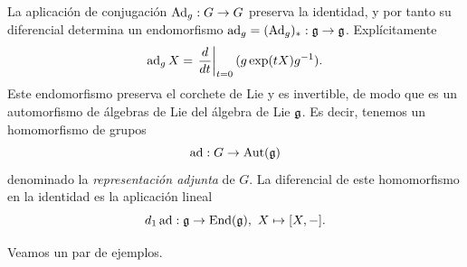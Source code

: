 \documentclass[11pt,a4paper]{amsbook}
\theoremstyle{remark} \newtheorem{rmk}[subsection]{Observación}
\theoremstyle{definition} \newtheorem{defn}[subsection]{Definición}
\theoremstyle{definition} \newtheorem{ex}[subsection]{Ejemplo}
\theoremstyle{definition} \newtheorem{ej}[subsection]{Ejercicio}
\begin{document}
\subsection{} La aplicación de conjugación $\operatorname{Ad}_g:G\rightarrow G$ preserva la identidad, y por tanto su diferencial determina un endomorfismo $\operatorname{ad}_g=(\operatorname{Ad}_g)_*:\mathfrak{g} \rightarrow \mathfrak{g}$. Explícitamente
\begin{equation*}
\operatorname{ad}_g X = \left. \frac{d}{dt}\right|_{t=0} (g \exp(tX) g^{-1}).
\end{equation*}
Este endomorfismo preserva el corchete de Lie y es invertible, de modo que es un automorfismo de álgebras de Lie del álgebra de Lie $\mathfrak{g}$. Es decir, tenemos un homomorfismo de grupos
\begin{equation*}
\operatorname{ad}: G \rightarrow \operatorname{Aut}(\mathfrak{g})
\end{equation*}
denominado la \emph{representación adjunta} de $G$. La diferencial de este homomorfismo en la identidad es la aplicación lineal
\begin{equation*}
d_1\operatorname{ad}: \mathfrak{g} \rightarrow \mathrm{End}(\mathfrak{g}),\ X \mapsto [X,-].
\end{equation*}

Veamos un par de ejemplos.
\end{document}
